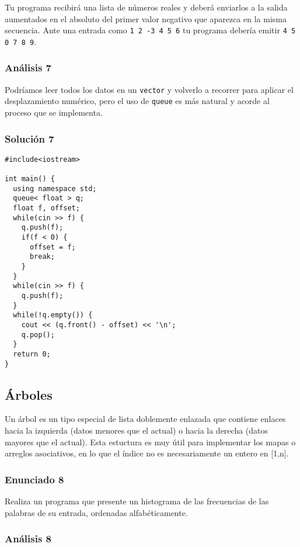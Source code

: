 \documentclass[10pt,letterpaper,twocolumn,spanish]{article}
\begin{document}
Tu programa recibirá una lista de números reales y deberá enviarlos a la salida aumentados en el absoluto del primer valor negativo que aparezca en la misma secuencia. Ante una entrada como \texttt{1 2 -3 4 5 6} tu programa debería emitir \texttt{4 5 0 7 8 9}.

\subsubsection*{Análisis 7}

Podríamos leer todos los datos en un \texttt{vector} y volverlo a recorrer para aplicar el desplazamiento numérico, pero el uso de \texttt{queue} es más natural y acorde al proceso que se implementa.

\subsubsection*{Solución 7}

\begin{verbatim}
#include<iostream>

int main() {
  using namespace std;
  queue< float > q;
  float f, offset;
  while(cin >> f) {
    q.push(f);
    if(f < 0) {
      offset = f;
      break;
    }
  }
  while(cin >> f) {
    q.push(f);
  }
  while(!q.empty()) {
    cout << (q.front() - offset) << '\n';
    q.pop();
  }
  return 0;
}
\end{verbatim}

\subsection*{Árboles}

Un árbol es un tipo especial de lista doblemente enlazada que contiene enlaces hacia la izquierda (datos menores que el actual) o hacia la derecha (datos mayores que el actual). Esta estuctura es muy útil para implementar los mapas o arreglos asociativos, en lo que el índice no es necesariamente un entero en [1,n].

\subsubsection*{Enunciado 8}

Realiza un programa que presente un histograma de las frecuencias de las palabras de su entrada, ordenadas alfabéticamente.

\subsubsection*{Análisis 8}
\end{document}
